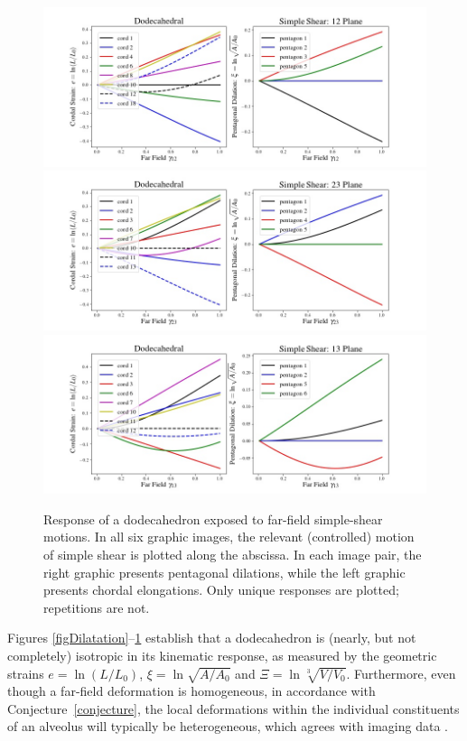 \begin{figure}
	\centering
	\includegraphics[width=14cm]{figures/shear12.jpg} \\
	\includegraphics[width=14cm]{figures/shear23.jpg} \\
	\includegraphics[width=14cm]{figures/shear13.jpg} 
	\caption{Response of a dodecahedron exposed to far-field simple-shear motions.  In all six graphic images, the relevant (controlled) motion of simple shear is plotted along the abscissa.  In each image pair, the right graphic presents pentagonal dilations, while the left graphic presents chordal elongations. Only unique responses are plotted; repetitions are not.}
	\label{figSimpleShears}
\end{figure}

Figures \ref{figDilatation}--\ref{figSimpleShears} establish that a dodecahedron is (nearly, but not completely) isotropic in its kinematic response, as measured by the geometric strains $e = \ln (L / L_0)$, $\xi = \ln \sqrt{A / A_0}$ and $\Xi = \ln \sqrt[3]{V / V_0}$.  Furthermore, even though a far-field deformation is homogeneous, in accordance with Conjecture~\ref{conjecture}, the local deformations within the individual constituents of an alveolus will typically be heterogeneous, which agrees with imaging data \cite{PerlmanBhattacharya07}.

